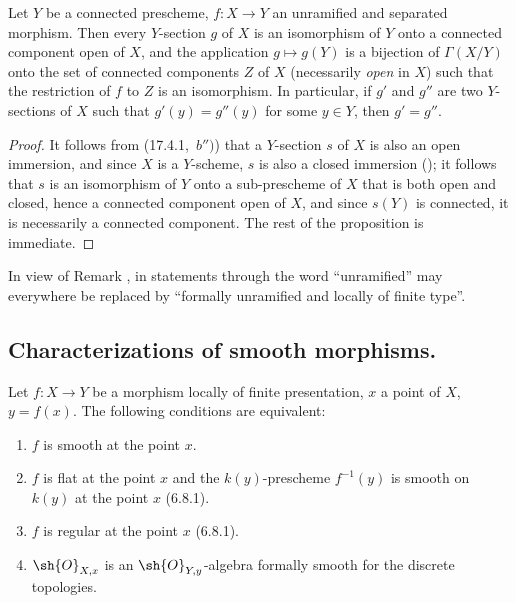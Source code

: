 \begin{proposition}[17.4.9]
\label{IV.17.4.9}
Let $Y$ be a connected prescheme, $f:X\to Y$ an unramified and separated morphism.
Then every $Y$-section $g$ of $X$ is an isomorphism of $Y$ onto a connected component open of $X$, and the application $g\mapsto g(Y)$ is a bijection of $\Gamma(X/Y)$ onto the set of connected components $Z$ of $X$ (necessarily \emph{open} in $X$) such that the restriction of $f$ to $Z$ is an isomorphism.
In particular, if $g'$ and $g''$ are two $Y$-sections of $X$ such that $g'(y)=g''(y)$ for some $y\in Y$, then $g'=g''$.
\end{proposition}

\begin{proof}
It follows from (17.4.1,~$b'')$) that a $Y$-section $s$ of $X$ is also an open immersion, and since $X$ is a $Y$-scheme, $s$ is also a closed immersion (); it follows that $s$ is an isomorphism of $Y$ onto a sub-prescheme of $X$ that is both open and closed, hence a connected component open of $X$, and since $s(Y)$ is connected, it is necessarily a connected component.
The rest of the proposition is immediate.
\end{proof}

\begin{remark}[17.4.10]
\label{IV.17.4.10}
In view of Remark , in statements  through  the word ``unramified'' may everywhere be replaced by ``formally unramified and locally of finite type''.
\end{remark}

\subsection{Characterizations of smooth morphisms.}
\label{subsection:IV.17.5}


\begin{theorem}[17.5.1]
\label{IV.17.5.1}
Let $f:X\to Y$ be a morphism locally of finite presentation, $x$ a point of $X$, $y=f(x)$.
The following conditions are equivalent:
\begin{enumerate}[label=(\alph*)]
  \item $f$ is smooth at the point $x$.
  \item $f$ is flat at the point $x$ and the $k(y)$-prescheme $f^{-1}(y)$ is smooth on $k(y)$ at the point $x$ (6.8.1).
  \item[b')] $f$ is regular at the point $x$ (6.8.1).
  \item $\sh{O}_{X,x}$ is an $\sh{O}_{Y,y}$-algebra formally smooth for the discrete topologies.
\end{enumerate}
\end{theorem}

